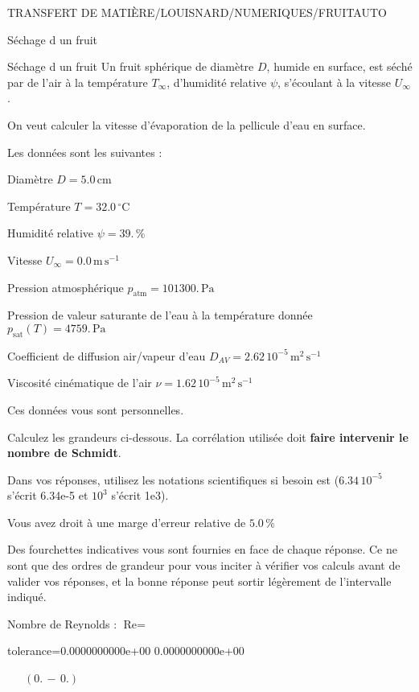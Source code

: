 \documentclass[12pt]{article}
\begin{document}
\begin{quiz}{TRANSFERT DE MATIÈRE/LOUISNARD/NUMERIQUES/FRUITAUTO}
\begin{cloze}{Séchage d un fruit}
\end{cloze} 


 \begin{cloze}{Séchage d un fruit} 
Un fruit sphérique de diamètre $D$, humide en surface, est séché par de l'air à la température $T_\infty$, d'humidité relative $\psi$, s'écoulant à la vitesse $U_\infty$.

On veut calculer la vitesse d'évaporation de la pellicule d'eau en surface.

 

Les données sont les suivantes :

 

Diamètre $D = 5.0\,  \mathrm{cm} $

Température $T = 32.0\,  \mathrm{^\circ\mathrm{C}} $

Humidité relative $\psi = 39.\, \% $

Vitesse $U_\infty = 0.0\,  \mathrm{m}\,  \mathrm{s}^{-1} $

Pression atmosphérique $p_{\text{atm}} = 101300.\,  \mathrm{Pa} $

Pression de valeur saturante de l’eau à la température donnée $p_{\text{sat}}(T) = 4759.\,  \mathrm{Pa} $

Coefficient de diffusion air/vapeur d’eau $D_{AV} =  2.62 \, 10^{-5} \,  \mathrm{m}^{2}\,  \mathrm{s}^{-1} $

Viscosité cinématique de l’air $\nu =  1.62 \, 10^{-5} \,  \mathrm{m}^{2}\,  \mathrm{s}^{-1} $

Ces données vous sont personnelles.

 

Calculez les grandeurs ci-dessous. La corrélation utilisée doit \textbf{faire intervenir le nombre de Schmidt}.

Dans vos réponses, utilisez les notations scientifiques si besoin est ($6.34\, 10^{-5}$ s'écrit 6.34e-5 et $10^{3}$ s'écrit 1e3).

Vous avez droit à une marge d'erreur relative de $5.0\, \% $

Des fourchettes indicatives vous sont fournies en face de chaque réponse. Ce ne sont que des ordres de grandeur pour vous inciter à vérifier vos calculs avant de valider vos réponses, et la bonne réponse peut sortir légèrement de l'intervalle indiqué.

 

Nombre de Reynolds : $\text{Re} =  $
\begin{numerical}[points=1] 
\item[tolerance={0.0000000000e+00}] 0.0000000000e+00 
\end{numerical} 
 $\,$ 
 $ \quad (0. \, - \, 0.) $ 


\end{cloze}
\end{quiz}
\end{document}
